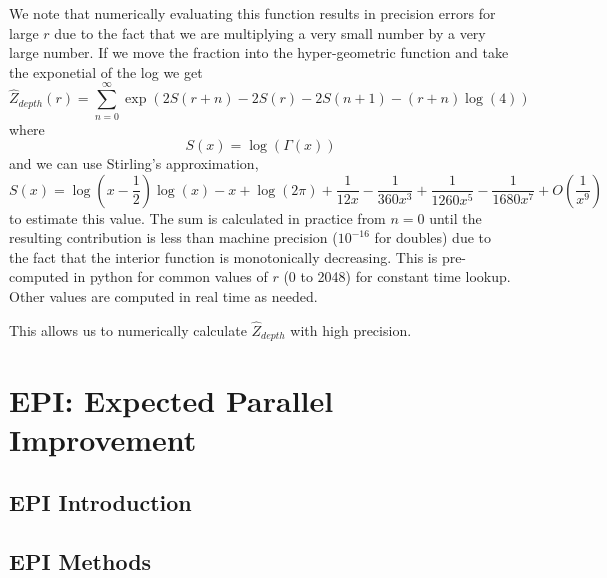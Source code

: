 \documentclass[phd,tocprelim]{cornell}
\begin{document}
We note that numerically evaluating this function results in precision errors for large $r$ due to the fact that we are multiplying a very small number by a very large number. If we move the fraction into the hyper-geometric function and take the exponetial of the log we get
\begin{equation}
    \hat{Z}_{depth}(r) = \sum_{n=0}^{\infty} \exp\left(2S(r+n) - 2S(r) - 2S(n+1) - (r+n)\log(4)\right)
\end{equation}
where
\begin{equation}
    S(x) = \log\left(\Gamma(x)\right)
\end{equation}
and we can use Stirling's approximation,
\begin{equation}
    S(x) = \log\left(x - \frac{1}{2}\right)\log(x) - x + \log(2\pi) + \frac{1}{12x} - \frac{1}{360x^{3}} + \frac{1}{1260x^{5}} - \frac{1}{1680x^{7}} + O\left(\frac{1}{x^{9}}\right)
\end{equation}
to estimate this value. The sum is calculated in practice from $n=0$ until the resulting contribution is less than machine precision ($10^{-16}$ for doubles) due to the fact that the interior function is monotonically decreasing. This is pre-computed in python for common values of $r$ (0 to 2048) for constant time lookup. Other values are computed in real time as needed.

This allows us to numerically calculate $\hat{Z}_{depth}$ with high precision.




\part{EPI: Expected Parallel Improvement} %
\label{prt:EPI: Expected Parallel Improvement}

\chapter{EPI Introduction} %
\label{cha:EPI Introduction}


\chapter{EPI Methods} %
\label{cha:EPI Methods}
\end{document}
